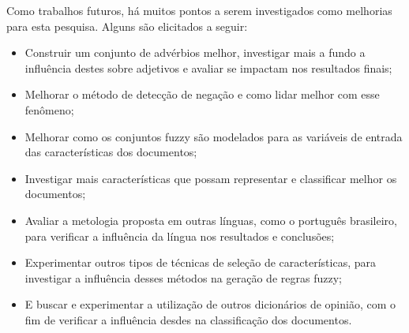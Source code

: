 \documentclass[template.tex]{subfiles}
\begin{document}
Como trabalhos futuros, há muitos pontos a serem investigados como melhorias para esta pesquisa. Alguns são elicitados a seguir:

\begin{itemize}
\item Construir um conjunto de advérbios melhor, investigar mais a fundo a influência destes sobre adjetivos e avaliar se impactam nos resultados finais;
\item Melhorar o método de detecção de negação e como lidar melhor com esse fenômeno;
\item Melhorar como os conjuntos fuzzy são modelados para as variáveis de entrada das características dos documentos;
\item Investigar mais características que possam representar e classificar melhor os documentos;
\item Avaliar a metologia proposta em outras línguas, como o português brasileiro, para verificar a influência da língua nos resultados e conclusões;
\item Experimentar outros tipos de técnicas de seleção de características, para investigar a influência desses métodos na geração de regras fuzzy;
\item E buscar e experimentar a utilização de outros dicionários de opinião, com o fim de verificar a influência desdes na classificação dos documentos.
\end{itemize}

\end{document}

